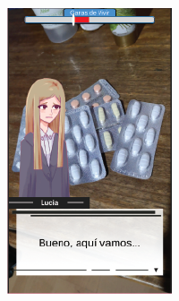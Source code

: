 \begin{figure}[h]
\begin{minipage}{.24\textwidth}
    \end{minipage}
    \begin{minipage}{.24\textwidth}
        \includegraphics[width=\textwidth]{imgs/screenshot-final1.png}
    \end{minipage}
    \begin{minipage}{.24\textwidth}

\end{minipage}
\end{figure}
